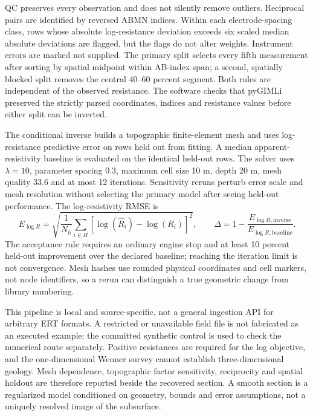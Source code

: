 QC preserves every observation and does not silently remove outliers.
Reciprocal pairs are identified by reversed ABMN indices. Within each
electrode-spacing class, rows whose absolute log-resistance deviation
exceeds six scaled median absolute deviations are flagged, but the flags
do not alter weights. Instrument errors are marked not supplied. The
primary split selects every fifth measurement after sorting by spatial
midpoint within AB-index span; a second, spatially blocked split removes
the central 40--60 percent segment. Both rules are independent of the
observed resistance. The software checks that pyGIMLi preserved the
strictly parsed coordinates, indices and resistance values before either
split can be inverted.

The conditional inverse builds a topographic finite-element mesh and
uses log-resistance predictive error on rows held out from fitting. A
median apparent-resistivity baseline is evaluated on the identical
held-out rows. The solver uses \(\lambda=10\), parameter spacing
\(0.3\), maximum cell size 10 m, depth 20 m, mesh quality 33.6 and at
most 12 iterations. Sensitivity reruns perturb error scale and mesh
resolution without selecting the primary model after seeing held-out
performance. The log-resistivity RMSE is
\begin{equation}\label{eq:ert-heldout}
 E_{\log R}=\sqrt{\frac{1}{N_h}\sum_{i\in H}
 [\log(\widehat R_i)-\log(R_i)]^2},\qquad
 \Delta=1-\frac{E_{\log R,\mathrm{inverse}}}
 {E_{\log R,\mathrm{baseline}}}.
\end{equation}
The acceptance rule requires an ordinary engine stop and at least 10
percent held-out improvement over the declared baseline; reaching the
iteration limit is not convergence. Mesh hashes use rounded physical
coordinates and cell markers, not node identifiers, so a rerun can
distinguish a true geometric change from library numbering.

This pipeline is local and source-specific, not a general ingestion API
for arbitrary ERT formats. A restricted or unavailable field file is not
fabricated as an executed example; the committed synthetic control is
used to check the numerical route separately. Positive resistances are
required for the log objective, and the one-dimensional Wenner survey
cannot establish three-dimensional geology. Mesh dependence, topographic
factor sensitivity, reciprocity and spatial holdout are therefore
reported beside the recovered section. A smooth section is a
regularized model conditioned on geometry, bounds and error assumptions,
not a uniquely resolved image of the subsurface.

